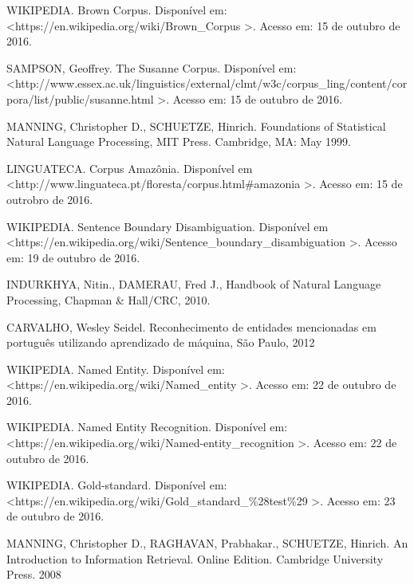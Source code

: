 \documentclass[11pt]{report}
\begin{document}
\begin{enumerate}[label={[\arabic*]}]
\item WIKIPEDIA. Brown Corpus. Disponível em: \textless\enspace https://en.wikipedia.org/wiki/Brown\_Corpus \enspace\textgreater. Acesso em: 15 de outubro de 2016.
\item SAMPSON, Geoffrey. The Susanne Corpus. Disponível em: \newline\textless\enspace http://www.essex.ac.uk/linguistics/external/clmt/w3c/corpus\_ling/content/\newline corpora/list/public/susanne.html \enspace\textgreater. Acesso em: 15 de outubro de 2016.
\item MANNING, Christopher D., SCHUETZE, Hinrich. Foundations of Statistical Natural Language Processing, MIT Press. Cambridge, MA: May 1999.
\item LINGUATECA. Corpus Amazônia. Disponível em \textless\enspace http://www.linguateca.pt/floresta/\newline corpus.html\#amazonia \enspace\textgreater. Acesso em: 15 de outrobro de 2016.
\item WIKIPEDIA. Sentence Boundary Disambiguation. Disponível em \newline\textless\enspace https://en.wikipedia.org/wiki/Sentence\_boundary\_disambiguation \enspace\textgreater. Acesso em: 19 de outubro de 2016.
\item INDURKHYA, Nitin., DAMERAU, Fred J., Handbook of Natural Language Processing, Chapman \& Hall/CRC, 2010.
\item CARVALHO, Wesley Seidel. Reconhecimento de entidades mencionadas em português utilizando aprendizado de máquina, São Paulo, 2012
\item WIKIPEDIA. Named Entity. Disponível em: \newline\textless\enspace https://en.wikipedia.org/wiki/Named\_entity \enspace\textgreater. Acesso em: 22 de outubro de 2016.
\item WIKIPEDIA. Named Entity Recognition. Disponível em: \newline\textless\enspace https://en.wikipedia.org/wiki/Named-entity\_recognition \enspace\textgreater. Acesso em: 22 de outubro de 2016.
\item WIKIPEDIA. Gold-standard. Disponível em: \newline\textless\enspace https://en.wikipedia.org/wiki/Gold\_standard\_\%28test\%29 \enspace\textgreater. Acesso em: 23 de outubro de 2016.
\item MANNING, Christopher D., RAGHAVAN, Prabhakar., SCHUETZE, Hinrich. An Introduction to Information Retrieval. Online Edition. Cambridge University Press. 2008
\end{enumerate}
\end{document}

